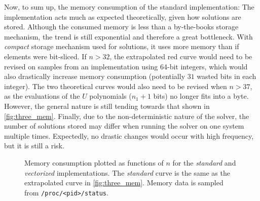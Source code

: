 Now, to sum up, the memory consumption of the standard implementation: The implementation acts much as expected theoretically, given how solutions are stored. Although the consumed memory is less than a by-the-books storage mechanism, the trend is still exponential and therefore a great bottleneck. With \textit{compact} storage mechanism used for solutions, it uses more memory than if elements were bit-sliced. If $n > 32$, the extrapolated red curve would need to be revised on samples from an implementation using 64-bit integers, which would also drastically increase memory consumption (potentially $31$ wasted bits in each integer). The two theoretical curves would also need to be revised when $n > 37$, as the evaluations of the $U$ polynomials ($n_1 + 1$ bits) no longer fits into a byte. However, the general nature is still tending towards that shown in \cref{fig:three_mem}. Finally, due to the non-deterministic nature of the solver, the number of solutions stored may differ when running the solver on one system multiple times. Expectedly, no drastic changes would occur with high frequency, but it is still a risk.

\begin{figure}[t]
    \centering
    \caption{Memory consumption plotted as functions of $n$ for the \textit{standard} and \textit{vectorized} implementations. The \textit{standard} curve is the same as the extrapolated curve in \cref{fig:three_mem}. Memory data is sampled from \texttt{/proc/<pid>/status}.} \label{fig:avx_simd_mem}
\end{figure}

